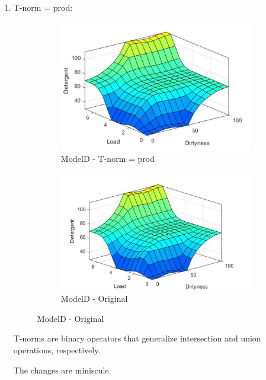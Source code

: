 \documentclass[11pt]{article}
\begin{document}
\begin{enumerate}[label=(\alph*)]
\begin{enumerate}[label=(\roman*)]
    \item T-norm = prod:

    \begin{figure}[ht!]
    \centering
    \begin{subfigure}{.5\textwidth}
      \centering
      \includegraphics[width=.9\linewidth]{res/modelD_t-norm}
      \caption{ModelD - T-norm = prod}
      \label{fig:sub1}
    \end{subfigure}%
    \begin{subfigure}{.5\textwidth}
      \centering
      \includegraphics[width=.9\linewidth]{res/image2}
      \caption{ModelD - Original}
      \label{fig:sub2}
    \end{subfigure}
    \end{figure}

    T-norms are binary operators that generalize intersection and union
    operations, respectively.

    The changes are miniscule.

  \end{enumerate}


\end{enumerate}
\end{document}
